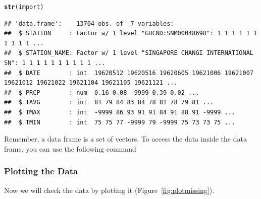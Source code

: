 \documentclass{article}\usepackage[]{graphicx}\usepackage[]{color}
\makeatletter
\newcommand{\hlstd}[1]{\textcolor[rgb]{0.345,0.345,0.345}{#1}}%
\newcommand{\hlkwd}[1]{\textcolor[rgb]{0.737,0.353,0.396}{\textbf{#1}}}%
\newenvironment{kframe}{%
 \def\at@end@of@kframe{}%
 \ifinner\ifhmode%
  \def\at@end@of@kframe{\end{minipage}}%
  \begin{minipage}{\columnwidth}%
 \fi\fi%
 \def\FrameCommand##1{\hskip\@totalleftmargin \hskip-\fboxsep
 \colorbox{shadecolor}{##1}\hskip-\fboxsep
     \hskip-\linewidth \hskip-\@totalleftmargin \hskip\columnwidth}%
 \MakeFramed {\advance\hsize-\width
   \@totalleftmargin\z@ \linewidth\hsize
   \@setminipage}}%
 {\par\unskip\endMakeFramed%
 \at@end@of@kframe}
\newenvironment{knitrout}{}{} %
\makeatother
\begin{document}
\begin{knitrout}
\color{fgcolor}\begin{kframe}
\begin{alltt}
\hlkwd{str}\hlstd{(import)}
\end{alltt}
\begin{verbatim}
## 'data.frame':	13704 obs. of  7 variables:
##  $ STATION     : Factor w/ 1 level "GHCND:SNM00048698": 1 1 1 1 1 1 1 1 1 1 ...
##  $ STATION_NAME: Factor w/ 1 level "SINGAPORE CHANGI INTERNATIONAL SN": 1 1 1 1 1 1 1 1 1 1 ...
##  $ DATE        : int  19620512 19620516 19620605 19621006 19621007 19621012 19621022 19621104 19621105 19621121 ...
##  $ PRCP        : num  0.16 0.08 -9999 0.39 0.02 ...
##  $ TAVG        : int  81 79 84 83 84 78 81 78 79 81 ...
##  $ TMAX        : int  -9999 86 93 91 91 84 91 88 91 -9999 ...
##  $ TMIN        : int  75 75 77 -9999 79 -9999 75 73 73 75 ...
\end{verbatim}
\end{kframe}
\end{knitrout}

Remember, a data frame is a set of vectors. To access the data inside the data frame, you can use the following command


\subsubsection{Plotting the Data}

Now we will check the data by plotting it (Figure~\ref{fig:plotmissing}).
\end{document}
